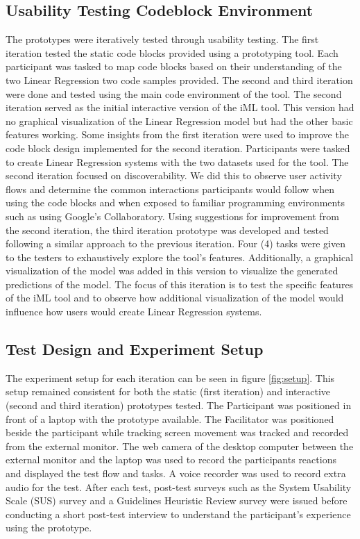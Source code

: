 \documentclass{sigchi-ext}
\begin{document}
\subsection{Usability Testing Codeblock Environment}
The prototypes were iteratively tested through usability testing. The first iteration tested the static code blocks provided using a prototyping tool. Each participant was tasked to map code blocks based on their understanding of the two Linear Regression two code samples provided. The second and third iteration were done and tested using the main code environment of the tool. The second iteration served as the initial interactive version of the iML tool. This version had no graphical visualization of the Linear Regression model but had the other basic features working. Some insights from the first iteration were used to improve the code block design implemented for the second iteration. Participants were tasked to create Linear Regression systems with the two datasets used for the tool. The second iteration focused on discoverability. We did this to observe user activity flows and determine the common interactions participants would follow when using the code blocks and when exposed to familiar programming environments such as using Google's Collaboratory. Using suggestions for improvement from the second iteration, the third iteration prototype was developed and tested following a similar approach to the previous iteration. Four (4) tasks were given to the testers to exhaustively explore the tool's features. Additionally, a graphical visualization of the model was added in this version to visualize the generated predictions of the model. The focus of this iteration is to test the specific features of the iML tool and to observe how additional visualization of the model would influence how users would create Linear Regression systems. 

\subsection{Test Design and Experiment Setup}
The experiment setup for each iteration can be seen in figure \ref{fig:setup}. This setup remained consistent for both the static (first iteration) and interactive (second and third iteration) prototypes tested. The Participant was positioned in front of a laptop with the prototype available. The Facilitator was positioned beside the participant while tracking screen movement was tracked and recorded from the external monitor. The web camera of the desktop computer between the external monitor and the laptop was used to record the participants reactions and displayed the test flow and tasks. A voice recorder was used to record extra audio for the test. After each test, post-test surveys such as the System Usability Scale (SUS) survey and a Guidelines Heuristic Review survey were issued before conducting a short post-test interview to understand the participant's experience using the prototype. 
\end{document}

